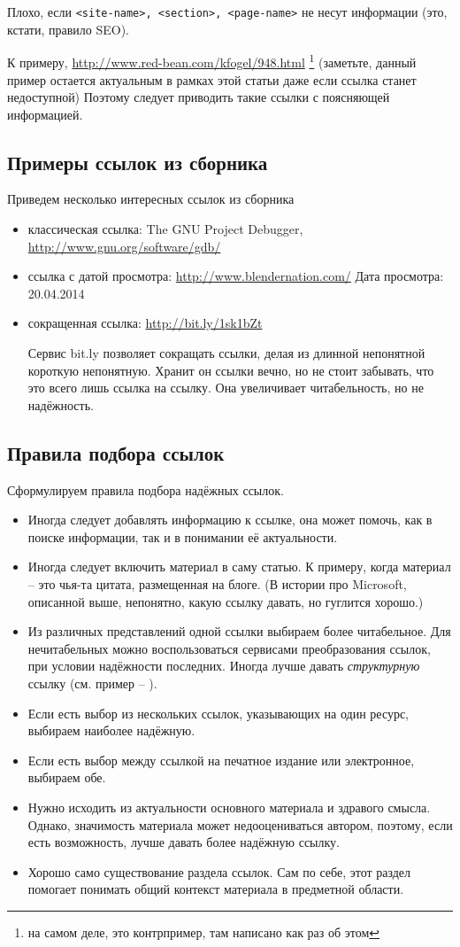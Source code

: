 \documentclass[10pt, a5paper]{article}
\begin{document}
Плохо, если  \texttt{<site-name>, <section>, <page-name>} 
не  несут  информации  (это, кстати, правило SEO).

К  примеру, \url{http://www.red-bean.com/kfogel/948.html}  
\footnote{на самом деле, это контрпример, там написано как раз об этом}
(заметьте, данный пример остается актуальным в рамках  этой  статьи  даже  если
ссылка  станет  недоступной)  Поэтому  следует приводить такие ссылки с
поясняющей информацией.

\subsection*{Примеры ссылок из сборника}
Приведем несколько интересных ссылок из сборника \cite{AY5}
\begin{itemize}
\item классическая ссылка: 
The GNU Project Debugger, \url{http://www.gnu.org/software/gdb/}
\item ссылка с датой просмотра: 
\url{http://www.blendernation.com/} Дата просмотра: 20.04.2014
\item сокращенная ссылка: \url{http://bit.ly/1sk1bZt}

Сервис bit.ly позволяет сокращать ссылки, делая из длинной
непонятной короткую непонятную. Хранит он ссылки вечно, но не
стоит забывать, что это всего лишь ссылка на ссылку. Она увеличивает
читабельность, но не надёжность.
\end{itemize}

\subsection*{Правила подбора ссылок}
Сформулируем правила подбора надёжных ссылок.
\begin{itemize}
\item Иногда следует добавлять информацию к ссылке, она может помочь, как 
в поиске информации, так и в понимании её актуальности.
\item Иногда следует включить материал в саму статью. К примеру, когда
материал – это чья-та цитата, размещенная на блоге. (В 
истории про Microsoft, описанной выше, непонятно, какую ссылку
давать, но гуглится хорошо.)
\item Из различных представлений одной ссылки выбираем более читабельное.
Для нечитабельных можно воспользоваться сервисами преобразования ссылок, 
при условии надёжности последних. Иногда лучше давать \textit{структурную} ссылку 
(см. пример -- \cite{AY3}).
\item Если есть выбор из нескольких ссылок, указывающих на один ресурс,
выбираем наиболее надёжную.
\item Если есть выбор между ссылкой на печатное издание или электронное,
выбираем обе.
\item Нужно исходить из актуальности основного материала и 
здравого смысла. Однако, значимость материала может недооцениваться 
автором, поэтому, если есть возможность, лучше давать более надёжную 
ссылку. 
\item Хорошо само существование раздела ссылок. Сам по себе, 
этот раздел помогает понимать общий контекст материала
в предметной области.  

\end{itemize}
\end{document}

